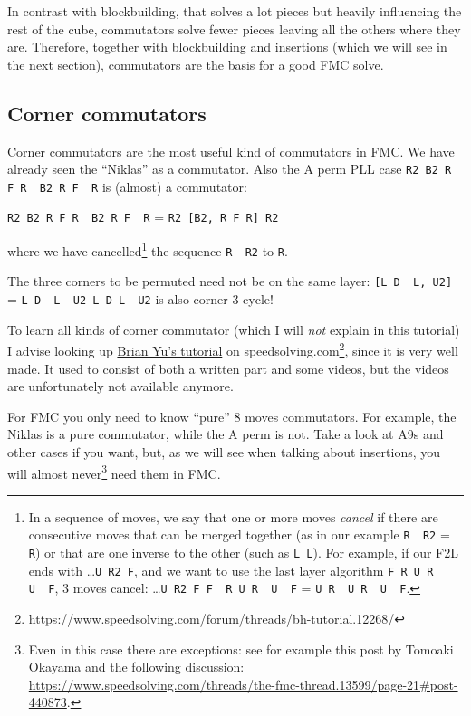 \documentclass[11pt,a4paper]{book}
\newcommand{\p}{\textquotesingle}
\newcommand{\m}{\texttt}
\newcommand{\ps}{\p\,\,}
\begin{document}
In contrast with blockbuilding, that solves a lot pieces but heavily influencing the rest of the cube, commutators solve fewer pieces leaving all the others where they are. Therefore, together with blockbuilding and insertions (which we will see in the next section), commutators are the basis for a good FMC solve.

\subsection{Corner commutators}

Corner commutators are the most useful kind of commutators in FMC. We have already seen the ``Niklas'' as a commutator. Also the A perm PLL case \m{R2 B2 R F R\ps B2 R F\ps R} is (almost) a commutator:

\begin{center}
\m{R2 B2 R F R\ps B2 R F\ps R} = \m{R2 [B2, R F R\p] R2}
\end{center}

where we have cancelled\footnote{In a sequence of moves, we say that one or more moves \emph{cancel} if there are consecutive moves that can be merged together (as in our example \m{R\ps R2} = \m R) or that are one inverse to the other (such as \m{L L\p}). For example, if our F2L ends with \dots\m{U R2 F\p}, and we want to use the last layer algorithm \m{F R U R\ps U\ps F\p}, 3 moves cancel:
\dots\m{U R2 F F\ps R U R\ps U\ps F\p} = \m{U R\ps U R\ps U\ps F\p}.} the sequence \m{R\ps R2} to \m R.

The three corners to be permuted need not be on the same layer: \m{[L D\ps L\p, U2]} = \m{L D\ps L\ps U2 L D L\ps U2} is also corner 3-cycle!

To learn all kinds of corner commutator (which I will \emph{not} explain in this tutorial) I advise looking up \href{https://www.speedsolving.com/forum/threads/bh-tutorial.12268/}{Brian Yu's tutorial} on speedsolving.com\footnote{\url{https://www.speedsolving.com/forum/threads/bh-tutorial.12268/}}, since it is very well made. It used to consist of both a written part and some videos, but the videos are unfortunately not available anymore.

For FMC you only need to know ``pure'' 8 moves commutators. For example, the Niklas is a pure commutator, while the A perm is not. Take a look at A9s and other cases if you want, but, as we will see when talking about insertions, you will almost never\footnote{Even in this case there are exceptions: see for example this post by Tomoaki Okayama and the following discussion: \url{https://www.speedsolving.com/threads/the-fmc-thread.13599/page-21\#post-440873}.} need them in FMC.
\end{document}
